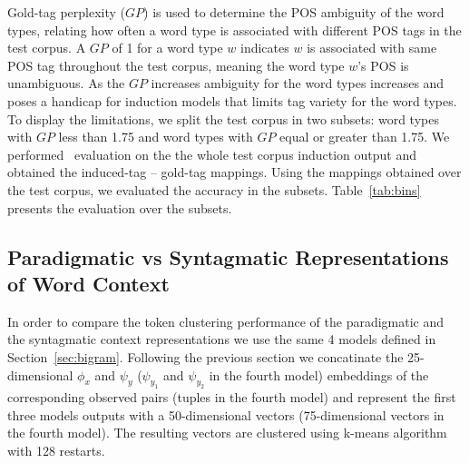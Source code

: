 Gold-tag perplexity ($GP$) is used to determine the POS ambiguity of
the word types, relating how often a word type is associated with
different POS tags in the test corpus.  A $GP$ of 1 for a word type
$w$ indicates $w$ is associated with same POS tag throughout the test
corpus, meaning the word type $w$'s POS is unambiguous.  As the $GP$
increases ambiguity for the word types increases and poses a handicap
for induction models that limits tag variety for the word types.  To
display the limitations, we split the test corpus in two subsets: word
types with $GP$ less than 1.75 and word types with $GP$ equal or greater
than 1.75.  We performed \mto\ evaluation on the the whole test corpus
induction output and obtained the induced-tag -- gold-tag
mappings. Using the mappings obtained over the test corpus, we
evaluated the accuracy in the subsets.  Table~\ref{tab:bins} presents
the evaluation over the subsets.

\subsection{Paradigmatic vs Syntagmatic Representations of Word Context}

In order to compare the token clustering performance of the
paradigmatic and the syntagmatic context representations we use the
same 4 models defined in Section~\ref{sec:bigram}.  Following the
previous section we concatinate the 25-dimensional $\phi_x$ and
$\psi_y$ ($\psi_{y_{1}}$ and $\psi_{y_{2}}$ in the fourth model) embeddings of
the corresponding observed pairs (tuples in the fourth model) and
represent the first three models outputs with a 50-dimensional vectors
(75-dimensional vectors in the fourth model).  The resulting vectors
are clustered using k-means algorithm with 128 restarts.

